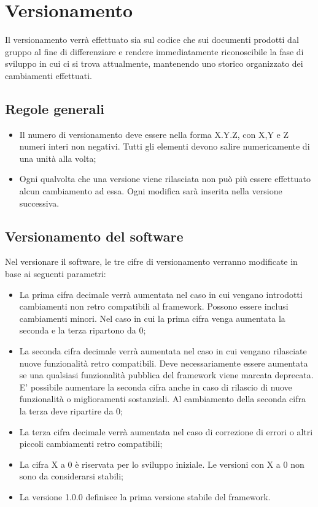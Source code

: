 \newpage
\section{Versionamento}
\label{6.0}
Il versionamento verrà effettuato sia sul codice che sui documenti prodotti dal gruppo al fine di differenziare e rendere immediatamente riconoscibile la fase di sviluppo in cui ci si trova attualmente, mantenendo uno storico organizzato dei cambiamenti effettuati.

\subsection{Regole generali}
\label{6.1}
\begin{itemize}
\item Il numero di versionamento deve essere nella forma X.Y.Z, con X,Y e Z numeri interi non negativi. Tutti gli elementi devono salire numericamente di una unità alla volta;
\item Ogni qualvolta che una versione viene rilasciata non può più essere effettuato alcun cambiamento ad essa. Ogni modifica sarà inserita nella versione successiva.
\end{itemize}

\subsection{Versionamento del software}
\label{6.2}
Nel versionare il software, le tre cifre di versionamento verranno modificate in base ai seguenti parametri:
\begin{itemize}
\item La prima cifra decimale verrà aumentata nel caso in cui vengano introdotti cambiamenti non retro compatibili al framework. Possono essere inclusi cambiamenti minori. Nel caso in cui la prima cifra venga aumentata la seconda e la terza ripartono da 0;
\item La seconda cifra decimale verrà aumentata nel caso in cui vengano rilasciate nuove funzionalità retro compatibili. Deve necessariamente essere aumentata se una qualsiasi funzionalità pubblica del framework viene marcata deprecata. E' possibile aumentare la seconda cifra anche in caso di rilascio di nuove funzionalità o miglioramenti sostanziali. Al cambiamento della seconda cifra la terza deve ripartire da 0;
\item La terza cifra decimale verrà aumentata nel caso di correzione di errori o altri piccoli cambiamenti retro compatibili;
\item La cifra X a 0 è riservata per lo sviluppo iniziale. Le versioni con X a 0 non sono da considerarsi stabili;
\item La versione 1.0.0 definisce la prima versione stabile del framework.
\end{itemize}

